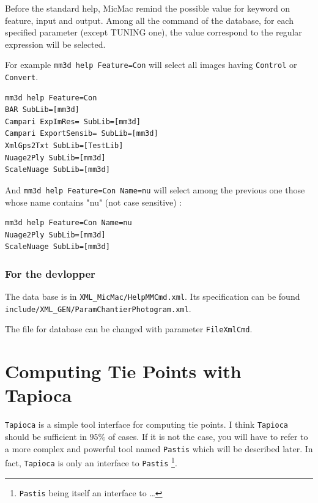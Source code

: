 Before the standard help, MicMac remind the possible value for
keyword on feature, input and output. Among all the command of
the database,  for each specified parameter (except TUNING one),
the value correspond to the regular expression will be selected.

For example {\tt mm3d help Feature=Con} will select all images
having {\tt Control} or {\tt Convert}.  

\begin{verbatim}
mm3d help Feature=Con
BAR SubLib=[mm3d]
Campari ExpImRes= SubLib=[mm3d]
Campari ExportSensib= SubLib=[mm3d]
XmlGps2Txt SubLib=[TestLib]
Nuage2Ply SubLib=[mm3d]
ScaleNuage SubLib=[mm3d]
\end{verbatim}

And {\tt mm3d help Feature=Con Name=nu} will select among the previous
one those whose name  contains "nu" (not case sensitive) :

\begin{verbatim}
mm3d help Feature=Con Name=nu
Nuage2Ply SubLib=[mm3d]
ScaleNuage SubLib=[mm3d]
\end{verbatim}


\subsubsection{For the devlopper}

The data base is in {\tt XML\_MicMac/HelpMMCmd.xml}.
Its specification can be found {\tt include/XML\_GEN/ParamChantierPhotogram.xml}.

The file for database can be changed with parameter {\tt FileXmlCmd}.






\section{Computing Tie Points with Tapioca}

{\tt Tapioca} is a simple tool interface for computing tie points.
I think {\tt Tapioca}  should be sufficient in $95\%$ of cases.
If it is not the case, you will have to refer to a more complex and powerful
tool named {\tt Pastis} which will be described later.
In fact, {\tt Tapioca} is only an interface to {\tt Pastis}
\footnote{{\tt Pastis}  being itself an interface to \SiftPP \dots}.

